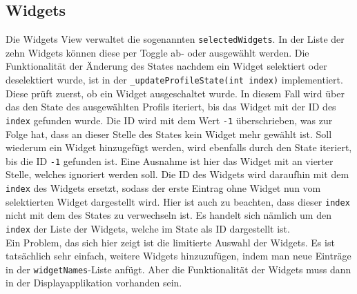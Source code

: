\subsection{Widgets}
Die Widgets View verwaltet die sogenannten \texttt{selectedWidgets}. In der Liste der zehn Widgets können diese per Toggle ab- oder ausgewählt werden. Die Funktionalität der Änderung des States nachdem ein Widget selektiert oder deselektiert wurde, ist in der \texttt{\_updateProfileState(int index)} implementiert. Diese prüft zuerst, ob ein Widget ausgeschaltet wurde. In diesem Fall wird über das den State des ausgewählten Profils iteriert, bis das Widget mit der ID des \texttt{index} gefunden wurde. Die ID wird mit dem Wert \texttt{-1} überschrieben, was zur Folge hat, dass an dieser Stelle des States kein Widget mehr gewählt ist. Soll wiederum ein Widget hinzugefügt werden, wird ebenfalls durch den State iteriert, bis die ID \texttt{-1} gefunden ist. Eine Ausnahme ist hier das Widget mit an vierter Stelle, welches ignoriert werden soll. Die ID des Widgets wird daraufhin mit dem \texttt{index} des Widgets ersetzt, sodass der erste Eintrag ohne Widget nun vom selektierten Widget dargestellt wird. Hier ist auch zu beachten, dass dieser \texttt{index} nicht mit dem des States zu verwechseln ist. Es handelt sich nämlich um den \texttt{index} der Liste der Widgets, welche im State als ID dargestellt ist. \\
Ein Problem, das sich hier zeigt ist die limitierte Auswahl der Widgets. Es ist tatsächlich sehr einfach, weitere Widgets hinzuzufügen, indem man neue Einträge in der \texttt{widgetNames}-Liste anfügt. Aber die Funktionalität der Widgets muss dann in der Displayapplikation vorhanden sein.

